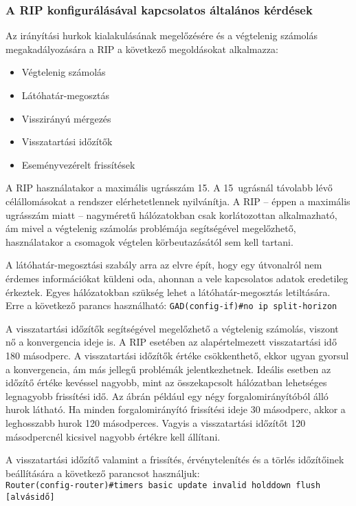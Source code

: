 \subsubsection{A RIP konfigurálásával kapcsolatos általános kérdések}
Az irányítási hurkok kialakulásának megelőzésére és a végtelenig számolás megakadályozására a RIP a következő megoldásokat alkalmazza:
\begin{itemize}[nosep]
	\item Végtelenig számolás
	\item Látóhatár-megosztás
	\item Visszirányú mérgezés
	\item Visszatartási időzítők
	\item Eseményvezérelt frissítések
\end{itemize}

A RIP használatakor a maximális ugrásszám 15. A 15~ugrásnál távolabb lévő célállomásokat a rendszer elérhetetlennek nyilvánítja. A RIP -- éppen a maximális ugrásszám miatt -- nagyméretű hálózatokban csak korlátozottan alkalmazható, ám mivel a végtelenig számolás problémája segítségével megelőzhető, használatakor a csomagok végtelen körbeutazásától sem kell tartani.

A látóhatár-megosztási szabály arra az elvre épít, hogy egy útvonalról nem érdemes információkat küldeni oda, ahonnan a vele kapcsolatos adatok eredetileg érkeztek. Egyes hálózatokban szükség lehet a látóhatár-megosztás letiltására.\\
Erre a következő parancs használható: \verb|GAD(config-if)#no ip split-horizon|

A visszatartási időzítők segítségével megelőzhető a végtelenig számolás, viszont nő a konvergencia ideje is. A RIP esetében az alapértelmezett visszatartási idő 180 másodperc. A visszatartási időzítők értéke csökkenthető, ekkor ugyan gyorsul a konvergencia, ám más jellegű problémák jelentkezhetnek. Ideális esetben az időzítő értéke kevéssel nagyobb, mint az összekapcsolt hálózatban lehetséges legnagyobb frissítési idő. Az ábrán például egy négy forgalomirányítóból álló hurok látható. Ha minden forgalomirányító frissítési ideje 30 másodperc, akkor a leghosszabb hurok 120 másodperces. Vagyis a visszatartási időzítőt 120 másodpercnél kicsivel nagyobb értékre kell állítani.

A visszatartási időzítő valamint a frissítés, érvénytelenítés és a törlés időzítőinek beállítására a következő parancsot használjuk:\\ \verb|Router(config-router)#timers basic update invalid holddown flush [alvásidő]|

